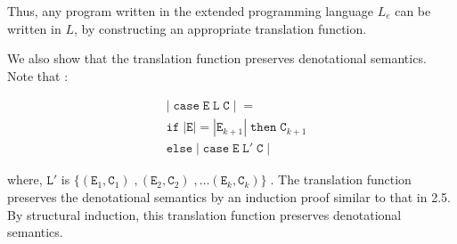 \documentclass[a4paper,10pt]{article}
\newcommand{\E}{\mathtt{E}}
\newcommand{\C}{\mathtt{C}}
\newcommand{\LL}{\mathtt{L}}
\newcommand{\ifsym}{\mathtt{if}}
\newcommand{\then}{\mathtt{then}}
\newcommand{\elsesym}{\mathtt{else}}
\newcommand{\case}{\mathtt{case}}
\begin{document}
\begin{enumerate}
Thus, any program written in the extended programming language $L_{e}$ can be
written in $L$, by constructing an appropriate translation function.

We also show that the translation function preserves denotational semantics.
Note that :

\begin{align*}
& | \; \case \; \E \; \LL \; \C \; |\; = \\
& \ifsym \; |\E| = |\E_{k+1}| \; \then \; \C_{k+1} \\
& \elsesym \; | \; \case \; \E \; \LL' \; \C \; |\; 
\end{align*} 

where, $\LL'$  is $ \{ (\E_{1}, \C_{1}) \;, (\E_{2}, \C_{2}) \;, \ldots
(\E_{k}, \C_{k}) \} \;$.
The translation function preserves the denotational semantics by an
induction proof similar to that in 2.5. By structural induction, this
translation function preserves denotational semantics.

\end{enumerate}
\end{document}
